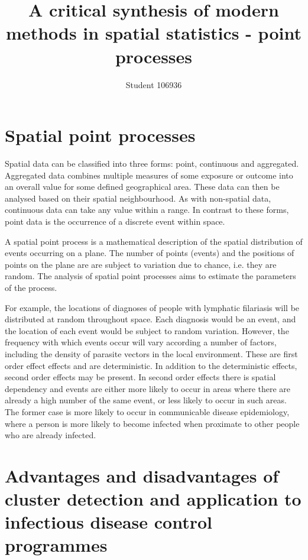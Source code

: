 \documentclass[a4paper,11pt]{article}
\title{A critical synthesis of modern methods in spatial statistics - point processes}
\author{Student 106936}
\begin{document}
\maketitle
\section{Spatial point processes}
Spatial data can be classified into three forms: point, continuous and aggregated. 
Aggregated data combines multiple measures of some exposure or outcome into an overall value for some defined geographical area. 
These data can then be analysed based on their spatial neighbourhood. 
As with non-spatial data, continuous data can take any value within a range. 
In contrast to these forms, point data is the occurrence of a discrete event within space. 

A spatial point process is a mathematical description of the spatial distribution of events occurring on a plane. 
The number of points (events) and the positions of points on the plane are are subject to variation due to chance, i.e. they are random. 
The analysis of spatial point processes aims to estimate the parameters of the process. 

For example, the locations of diagnoses of people with lymphatic filariasis will be distributed at random throughout space. 
Each diagnosis would be an event, and the location of each event would be subject to random variation. 
However, the frequency with which events occur will vary according a number of factors, including the density of parasite vectors in the local environment. 
These are first order effect effects and are deterministic. 
In addition to the deterministic effects, second order effects may be present. 
In second order effects there is spatial dependency and events are either more likely to occur in areas where there are already a high number of the same event, or less likely to occur in such areas. 
The former case is more likely to occur in communicable disease epidemiology, where a person is more likely to become infected when proximate to other people who are already infected. 


\section{Advantages and disadvantages of cluster detection and application to infectious disease control programmes}
\end{document}
